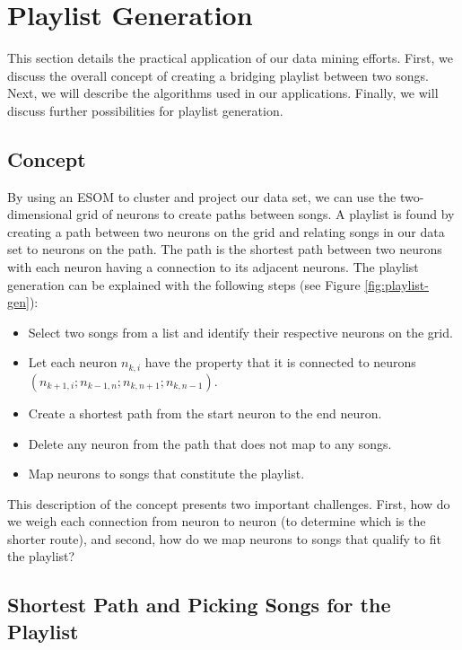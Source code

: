 \section{Playlist Generation} %
\label{sec:playlist_generation}

This section details the practical application of our data mining efforts. First, we discuss
the overall concept of creating a bridging playlist between two songs. Next, we will describe the algorithms used in our applications. Finally, we will discuss further possibilities for playlist generation.

\subsection{Concept}
By using an ESOM to cluster and project our data set, we can use the two-dimensional grid of neurons to create paths between songs. A  playlist is found by creating a path between two neurons on the grid and relating songs in our data set to neurons on the path. The path is the shortest path between two neurons with each neuron having a connection to its adjacent neurons. The playlist generation can be explained with the following steps (see Figure \ref{fig:playlist-gen}):
\begin{itemize}
\item Select two songs from a list and identify their respective neurons on the grid.
\item Let each neuron $ n_{k,i} $  have the property that it is connected to neurons $ ( n_{k+1,i} ; n_{k-1,n} ; n_{k,n+1} ; n_{k,n-1} ) $.
\item Create a shortest path from the start neuron to the end neuron.
\item Delete any neuron from the path that does not map to any songs.
\item Map neurons to songs that constitute the playlist.
\end{itemize}
\noindent
This description of the concept presents two important challenges. First, how do we weigh each connection from neuron to neuron (to determine which is the shorter route), and second, how do we map neurons to songs that qualify to fit the playlist?

\subsection{Shortest Path and Picking Songs for the Playlist}

